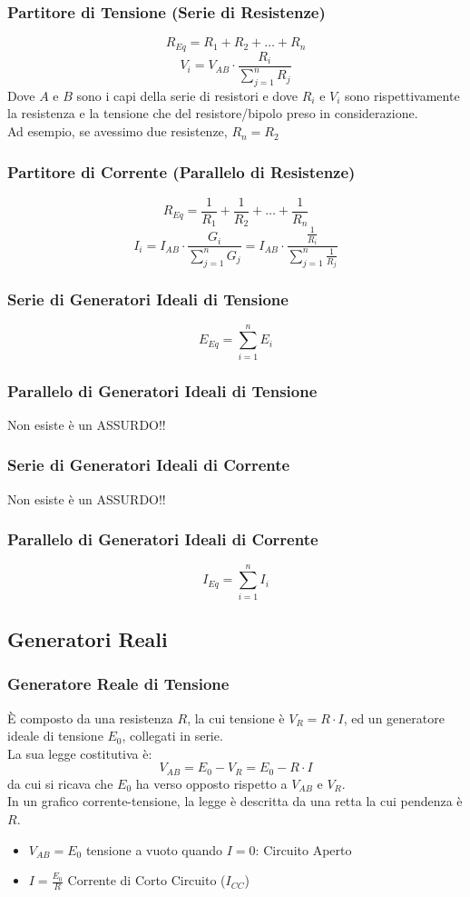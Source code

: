 \documentclass[../main.tex]{subfiles}
\begin{document}
	\subsubsection{Partitore di Tensione (Serie di Resistenze)}
	\[R_{Eq} = R_1 + R_2 + \dots + R_n\]
	\[V_{i} = V_{AB} \cdot \frac{R_i}{\sum_{j=1}^{n} R_j} \]
	Dove $A$ e $B$ sono i capi della serie di resistori e dove $R_i$ e $V_i$ sono rispettivamente la resistenza e la tensione che del resistore/bipolo preso in considerazione.\\
	Ad esempio, se avessimo due resistenze, $R_n = R_2$
	\subsubsection{Partitore di Corrente (Parallelo di Resistenze)}
	\[R_{Eq} = \frac{1}{R_1} + \frac{1}{R_2} + \dots + \frac{1}{R_n}\]
	\[I_i = I_{AB} \cdot \frac{G_i}{\sum_{j = 1}^{n} G_j} = I_{AB} \cdot \frac{\frac{1}{R_i}}{\sum_{j=1}^{n} \frac{1}{R_j}}\]
	\subsubsection{Serie di Generatori Ideali di Tensione}
	\[E_{Eq} = \sum_{i = 1}^{n} E_i\]
	\subsubsection{Parallelo di Generatori Ideali di Tensione}
	{\color{red} Non esiste è un ASSURDO!!}
	\subsubsection{Serie di Generatori Ideali di Corrente}
	{\color{red} Non esiste è un ASSURDO!!}
	\subsubsection{Parallelo di Generatori Ideali di Corrente}
	\[I_{Eq} = \sum_{i = 1}^{n} I_i\]
	\subsection{Generatori Reali}
	\subsubsection{Generatore Reale di Tensione}
	È composto da una resistenza $R$, la cui tensione è $V_R = R \cdot I$, ed un generatore ideale di tensione $E_0$, collegati in serie.\\
	La sua legge costitutiva è:
	\[V_{AB} = E_0 - V_R = E_0 - R \cdot I\]
	da cui si ricava che $E_0$ ha verso opposto rispetto a $V_{AB}$ e $V_R$.\\
	In un grafico corrente-tensione, la legge è descritta da una retta la cui pendenza è $R$.
	\begin{itemize}
		\item $V_{AB} = E_0$ tensione a vuoto quando $I=0$: Circuito Aperto
		\item $I = \frac{E_0}{R}$ Corrente di Corto Circuito ($I_{CC}$)
	\end{itemize}
\end{document}
